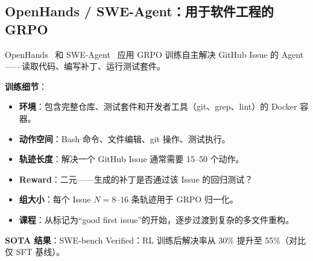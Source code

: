 \subsection{OpenHands / SWE-Agent：用于软件工程的 GRPO}
\label{openhands-swe-agent-grpo-for-software-engineering}

OpenHands~\cite{wang2024openhands} 和 SWE-Agent~\cite{yang2024sweagent} 应用 GRPO 训练自主解决 GitHub Issue 的 Agent——读取代码、编写补丁、运行测试套件。

\textbf{训练细节}：

\begin{itemize}
  \item \textbf{环境}：包含完整仓库、测试套件和开发者工具（git、grep、lint）的 Docker 容器。
  \item \textbf{动作空间}：Bash 命令、文件编辑、git 操作、测试执行。
  \item \textbf{轨迹长度}：解决一个 GitHub Issue 通常需要 15--50 个动作。
  \item \textbf{Reward}：二元——生成的补丁是否通过该 Issue 的回归测试？
  \item \textbf{组大小}：每个 Issue $N = 8$--$16$ 条轨迹用于 GRPO 归一化。
  \item \textbf{课程}：从标记为``good first issue''的开始，逐步过渡到复杂的多文件重构。
\end{itemize}

\textbf{SOTA 结果}：SWE-bench Verified：RL 训练后解决率从 30\% 提升至 55\%（对比仅 SFT 基线）。

